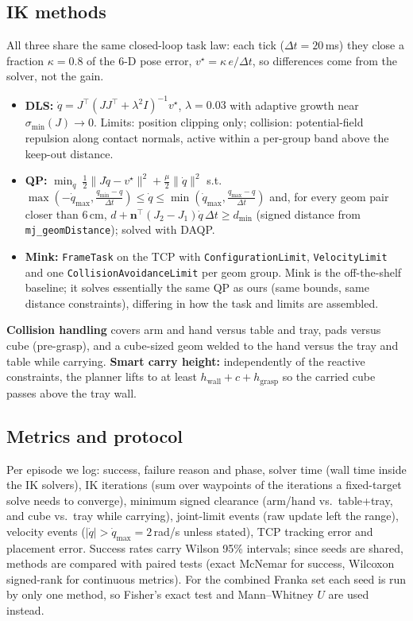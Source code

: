\documentclass[10pt,a4paper]{article}
\begin{document}
\subsection{IK methods}
All three share the same closed-loop task law: each tick ($\Delta t{=}20$\,ms) they close a fraction $\kappa{=}0.8$ of the 6-D pose error,
$v^\star=\kappa\,e/\Delta t$, so differences come from the solver, not the gain.
\begin{itemize}
\item \textbf{DLS:} $\dot q = J^\top (JJ^\top+\lambda^2 I)^{-1} v^\star$, $\lambda{=}0.03$ with adaptive growth near $\sigma_{\min}(J)\to0$. Limits: position clipping only;
collision: potential-field repulsion along contact normals, active within a per-group band above the keep-out distance.
\item \textbf{QP:} $\min_{\dot q}\ \tfrac12\|J\dot q-v^\star\|^2+\tfrac{\mu}{2}\|\dot q\|^2$ s.t.
$\max(-\dot q_{\max},\tfrac{q_{\min}-q}{\Delta t})\le\dot q\le\min(\dot q_{\max},\tfrac{q_{\max}-q}{\Delta t})$ and, for every geom pair closer than 6\,cm,
$d+\mathbf n^\top(J_2-J_1)\dot q\,\Delta t\ge d_{\min}$ (signed distance from \texttt{mj\_geomDistance}); solved with DAQP.
\item \textbf{Mink:} \texttt{FrameTask} on the TCP with \texttt{ConfigurationLimit}, \texttt{VelocityLimit} and one \texttt{CollisionAvoidanceLimit} per geom group.
Mink is the off-the-shelf baseline; it solves essentially the same QP as ours (same bounds, same distance constraints), differing in how the task and limits are assembled.
\end{itemize}
\textbf{Collision handling} covers arm and hand versus table and tray, pads versus cube (pre-grasp), and a cube-sized geom welded to the hand versus the tray and table while carrying.
\textbf{Smart carry height:} independently of the reactive constraints, the planner lifts to at least $h_{\text{wall}}+c+h_{\text{grasp}}$ so the carried cube passes above the tray wall.

\subsection{Metrics and protocol}
Per episode we log: success, failure reason and phase, solver time (wall time inside the IK solvers), IK iterations (sum over waypoints of the iterations a fixed-target solve
needs to converge), minimum signed clearance (arm/hand vs.\ table+tray, and cube vs.\ tray while carrying), joint-limit events (raw update left the range), velocity events
($|\dot q|>\dot q_{\max}{=}2$\,rad/s unless stated), TCP tracking error and placement error. Success rates carry Wilson 95\% intervals; since seeds are shared, methods are compared with paired tests
(exact McNemar for success, Wilcoxon signed-rank for continuous metrics). For the combined Franka set each seed is run by only one method, so Fisher's exact test and Mann--Whitney $U$ are used instead.
\end{document}
